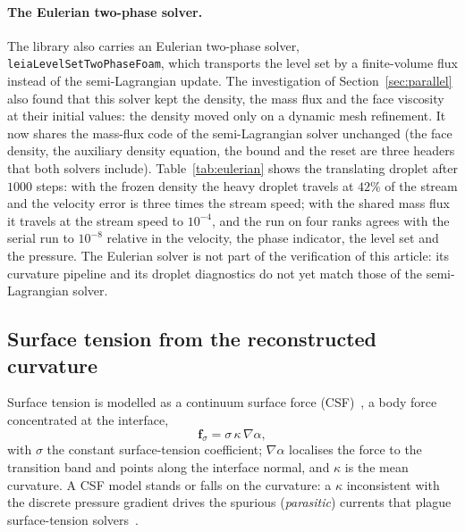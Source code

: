 \documentclass[preprint,3p,11pt]{elsarticle}
\begin{document}
\paragraph{The Eulerian two-phase solver.} The library also carries an Eulerian two-phase
solver, \texttt{leiaLevelSetTwoPhaseFoam}, which transports the level set by a
finite-volume flux instead of the semi-Lagrangian update. The investigation of
Section~\ref{sec:parallel} also found that this solver kept the density, the mass flux and
the face viscosity at their initial values: the density moved only on a dynamic mesh
refinement. It now shares the mass-flux code of the semi-Lagrangian solver unchanged (the
face density, the auxiliary density equation, the bound and the reset are three headers
that both solvers include). Table~\ref{tab:eulerian} shows the translating droplet after
$1000$ steps: with the frozen density the heavy droplet travels at $42\%$ of the stream
and the velocity error is three times the stream speed; with the shared mass flux it
travels at the stream speed to $10^{-4}$, and the run on four ranks agrees with the serial
run to $10^{-8}$ relative in the velocity, the phase indicator, the level set and the
pressure. The Eulerian solver is not part of the verification of this article: its
curvature pipeline and its droplet diagnostics do not yet match those of the
semi-Lagrangian solver.

\begin{table}[t]
  \centering
  \caption{The Eulerian two-phase solver of leia, translating droplet, $N=100$, $1000$
  steps ($t=0.0109$~s). Travelled fraction: the centroid displacement divided by
  $U_0t$.}
  \label{tab:eulerian}
  
\end{table}

\subsection{Surface tension from the reconstructed curvature}
\label{sec:surften}
Surface tension is modelled as a continuum surface force (CSF)~\cite{brackbill1992}, a body
force concentrated at the interface,
\begin{equation}
  \mathbf{f}_\sigma = \sigma\,\kappa\,\nabla\alpha,
  \label{eq:csf}
\end{equation}
with $\sigma$ the constant surface-tension coefficient; $\nabla\alpha$ localises the force
to the transition band and points along the interface normal, and $\kappa$ is the mean
curvature. A CSF model stands or falls on the curvature: a $\kappa$ inconsistent with the
discrete pressure gradient drives the spurious (\emph{parasitic}) currents that plague
surface-tension solvers~\cite{popinet2018}.
\end{document}
